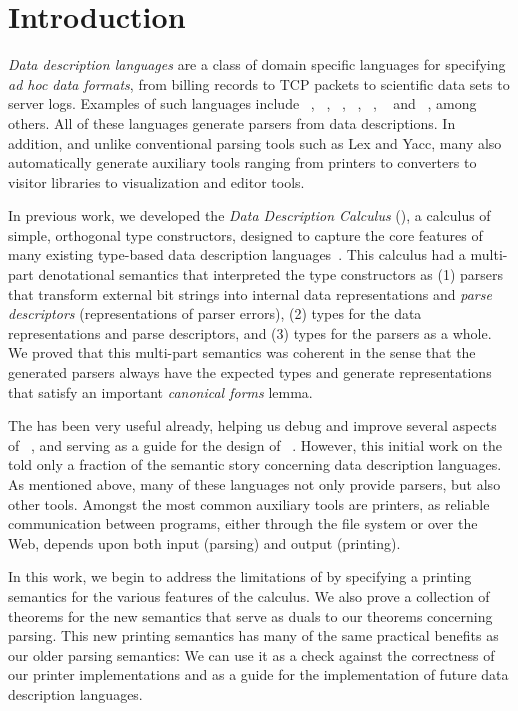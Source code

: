 \section{Introduction}
\label{sec:intro}

{\em Data description languages} are a class of domain specific
languages for specifying {\em ad hoc data formats}, from billing 
records to TCP packets to scientific data sets to server logs.  Examples 
of such languages include 
\bro~\cite{paxson:bro}, \datascript{}~\cite{gpce02}, \demeter~\cite{lieberherr+:class-dictionaries},
\packettypes{}~\cite{sigcomm00}, \padsc{}~\cite{fisher+:pads}, 
\padsml{}~\cite{mandelbaum+:padsml}  and
\xsugar~\cite{xsugar2005}, among others.  All of these languages
generate parsers from data descriptions.  In addition, and unlike
conventional parsing tools such as Lex and Yacc, many also automatically
generate auxiliary tools ranging from printers to \xml{} converters to
visitor libraries to visualization and editor tools.

In previous work, we developed the {\em Data Description Calculus}
(\ddcold{}), a calculus of simple, orthogonal type constructors,
designed to capture the core features of many existing type-based data
description languages~\cite{fisher+:next700ddl,fisher+:ddcjournal}.
This calculus had a multi-part denotational semantics that interpreted
the type constructors as (1) parsers that transform external bit
strings into internal data representations and {\em parse descriptors}
(representations of parser errors), (2) types for the data
representations and parse descriptors, and (3) types for the parsers
as a whole.  We proved that this multi-part semantics was coherent in
the sense that the generated parsers always have the expected types
and generate representations that satisfy an important {\em
canonical forms} lemma.

The \ddcold{} has been very useful already, helping us debug and
improve several aspects of \padsc{}~\cite{fisher+:pads}, and serving
as a guide for the design of \padsml{}~\cite{mandelbaum+:padsml}.
However, this initial work on the \ddcold{} told only a fraction of the
semantic story concerning data description languages.  As mentioned
above, many of these languages not only provide parsers, but
also other tools.  Amongst the most common auxiliary tools
are printers, as reliable communication between programs, either through
the file system or over the Web, depends upon both input (parsing) 
and output (printing).

In this work, we begin to address the limitations of
\ddcold{} by specifying a printing semantics for the
various features of the calculus.  We also
prove a collection of theorems for the new semantics that serve as
duals to our theorems concerning parsing.  This new printing semantics
has many of the same practical benefits as our older parsing 
semantics: We can
use it as a check against the correctness of our printer
implementations and as a guide for the
implementation of future data description languages.  


